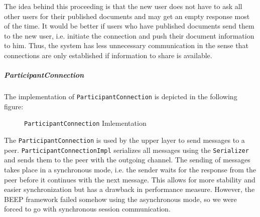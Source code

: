 The idea behind this proceeding is that the new user does not have to ask all other users for their published documents and may get an empty response most of the time. It would be better if users who have published documents send them to the new user, i.e. initiate the connection and push their document information to him. Thus, the system has less unnecessary communication in the sense that connections are only established if information to share is available.

\subparagraph{ParticipantConnection}
The implementation of \texttt{ParticipantConnection} is depicted in the following figure:

\begin{figure}[H]
 \centering
 \caption{\texttt{ParticipantConnection} Imlementation}
 \label{fig:network.protocol.participantconnectionimpl.uml}
\end{figure}

The \texttt{ParticipantConnection} is used by the upper layer to send messages to a peer. \texttt{Participant\-Connection\-Impl} serializes all messages using the \texttt{Serializer} and sends them to the peer with the outgoing channel. The sending of messages takes place in a synchronous mode, i.e. the sender waits for the response from the peer before it continues with the next message. This allows for more stability and easier synchronization but has a drawback in performance measure. However, the BEEP framework failed somehow using the asynchronous mode, so we were forced to go with synchronous session communication.

